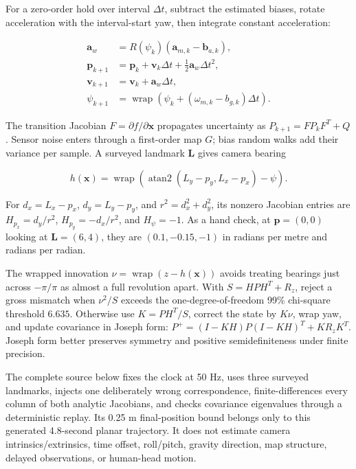 For a zero-order hold over interval \(\Delta t\), subtract the estimated biases, rotate acceleration with the interval-start yaw, then integrate constant acceleration:

\[
\begin{aligned}
\mathbf{a}_w &= R(\psi_k)(\mathbf{a}_{m,k}-\mathbf{b}_{a,k}),\\
\mathbf{p}_{k+1} &= \mathbf{p}_k+\mathbf{v}_k\Delta t+\tfrac12\mathbf{a}_w\Delta t^2,\\
\mathbf{v}_{k+1} &= \mathbf{v}_k+\mathbf{a}_w\Delta t,\\
\psi_{k+1} &= \operatorname{wrap}(\psi_k+(\omega_{m,k}-b_{g,k})\Delta t).
\end{aligned}
\]

The transition Jacobian \(F=\partial f/\partial\mathbf{x}\) propagates uncertainty as \(P_{k+1}=FP_kF^T+Q\). Sensor noise enters through a first-order map \(G\); bias random walks add their variance per sample. A surveyed landmark \(\mathbf{L}\) gives camera bearing

\[
h(\mathbf{x})=\operatorname{wrap}\!\left(\operatorname{atan2}(L_y-p_y,L_x-p_x)-\psi\right).
\]

For \(d_x=L_x-p_x\), \(d_y=L_y-p_y\), and \(r^2=d_x^2+d_y^2\), its nonzero Jacobian entries are \(H_{p_x}=d_y/r^2\), \(H_{p_y}=-d_x/r^2\), and \(H_\psi=-1\). As a hand check, at \(\mathbf{p}=(0,0)\) looking at \(\mathbf{L}=(6,4)\), they are \((0.1,-0.15,-1)\) in radians per metre and radians per radian.

The wrapped innovation \(\nu=\operatorname{wrap}(z-h(\mathbf{x}))\) avoids treating bearings just across \(-\pi/\pi\) as almost a full revolution apart. With \(S=HPH^T+R_z\), reject a gross mismatch when \(\nu^2/S\) exceeds the one-degree-of-freedom 99\% chi-square threshold \(6.635\). Otherwise use \(K=PH^T/S\), correct the state by \(K\nu\), wrap yaw, and update covariance in Joseph form: \(P^+=(I-KH)P(I-KH)^T+KR_zK^T\). Joseph form better preserves symmetry and positive semidefiniteness under finite precision.

The complete source below fixes the clock at 50 Hz, uses three surveyed landmarks, injects one deliberately wrong correspondence, finite-differences every column of both analytic Jacobians, and checks covariance eigenvalues through a deterministic replay. Its 0.25 m final-position bound belongs only to this generated 4.8-second planar trajectory. It does not estimate camera intrinsics/extrinsics, time offset, roll/pitch, gravity direction, map structure, delayed observations, or human-head motion.

